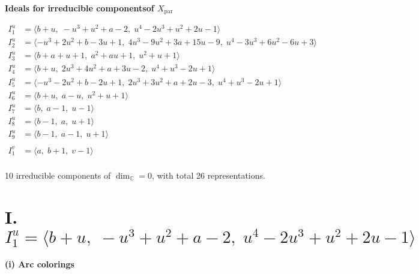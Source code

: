 \documentclass[1p]{elsarticle_modified}
\theoremstyle{definition}
\begin{document}
\phantom \\ \newline 
\centering \textbf{Ideals for irreducible components\footnotemark of $X_{\text{par}}$} 
 
\begin{align*}
I^u_{1}&=\langle 
b+u,\;- u^3+u^2+a-2,\;u^4-2 u^3+u^2+2 u-1\rangle \\
I^u_{2}&=\langle 
- u^3+2 u^2+b-3 u+1,\;4 u^3-9 u^2+3 a+15 u-9,\;u^4-3 u^3+6 u^2-6 u+3\rangle \\
I^u_{3}&=\langle 
b+a+u+1,\;a^2+a u+1,\;u^2+u+1\rangle \\
I^u_{4}&=\langle 
b+u,\;2 u^3+4 u^2+a+3 u-2,\;u^4+u^3-2 u+1\rangle \\
I^u_{5}&=\langle 
- u^3-2 u^2+b-2 u+1,\;2 u^3+3 u^2+a+2 u-3,\;u^4+u^3-2 u+1\rangle \\
I^u_{6}&=\langle 
b+u,\;a- u,\;u^2+u+1\rangle \\
I^u_{7}&=\langle 
b,\;a-1,\;u-1\rangle \\
I^u_{8}&=\langle 
b-1,\;a,\;u+1\rangle \\
I^u_{9}&=\langle 
b-1,\;a-1,\;u+1\rangle \\
\\
I^v_{1}&=\langle 
a,\;b+1,\;v-1\rangle \\
\end{align*}
\raggedright * 10 irreducible components of $\dim_{\mathbb{C}}=0$, with total 26 representations.\\
\newpage
\renewcommand{\arraystretch}{1}
\centering \section*{I. $I^u_{1}= \langle b+u,\;- u^3+u^2+a-2,\;u^4-2 u^3+u^2+2 u-1 \rangle$}
\flushleft \textbf{(i) Arc colorings}\\
\end{document}
